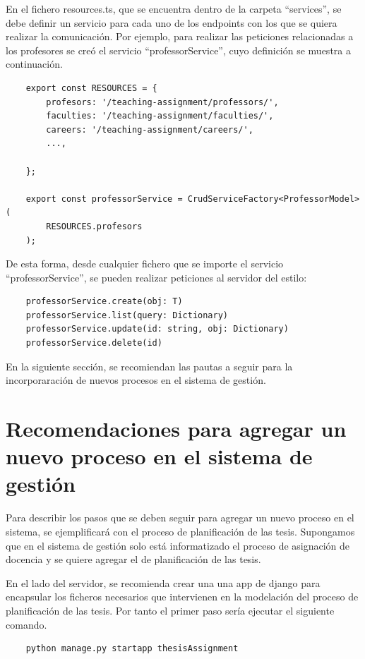 En el fichero resources.ts, que se encuentra dentro de la carpeta ``services'',
se debe definir un servicio para cada uno de los endpoints 
con los que se quiera realizar la comunicación. Por ejemplo,
para realizar las peticiones relacionadas a los profesores se 
creó el servicio ``professorService'', cuyo definición se muestra a continuación.

\begin{verbatim}
    export const RESOURCES = {
        profesors: '/teaching-assignment/professors/',
        faculties: '/teaching-assignment/faculties/',
        careers: '/teaching-assignment/careers/',
        ...,

    };

    export const professorService = CrudServiceFactory<ProfessorModel>(
        RESOURCES.profesors
    );
\end{verbatim}


De esta forma, desde cualquier fichero que se importe el servicio ``professorService'',
se pueden realizar peticiones al servidor del estilo:

\begin{verbatim}
    professorService.create(obj: T)
    professorService.list(query: Dictionary)
    professorService.update(id: string, obj: Dictionary)
    professorService.delete(id)
\end{verbatim}


En la siguiente sección, se recomiendan las pautas a seguir para la incorporaración 
de nuevos procesos en el sistema de gestión.

\section{Recomendaciones para agregar un nuevo proceso en el sistema de gestión}
Para describir los pasos que se deben seguir para agregar un nuevo proceso en el sistema,
se ejemplificará con el proceso de planificación de las tesis. Supongamos que en el 
sistema de gestión solo está informatizado el proceso de asignación de docencia y se 
quiere agregar el de planificación de las tesis.

En el lado del servidor,
se recomienda crear una una app de django para encapsular los ficheros necesarios 
que intervienen en la modelación del proceso de planificación de las tesis.
Por tanto el primer paso sería ejecutar el siguiente comando.

\begin{verbatim}
    python manage.py startapp thesisAssignment
\end{verbatim}

